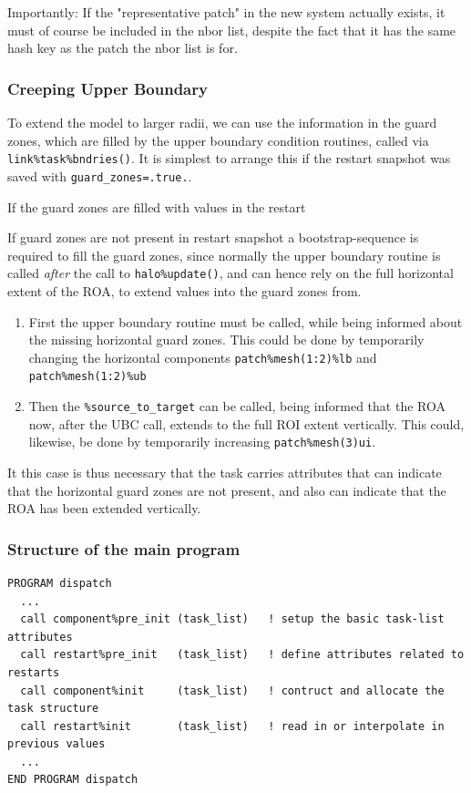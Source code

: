 \documentclass[paper=a4,fontsize=11pt]{scrartcl}
\numberwithin{equation}{section}		%
\numberwithin{figure}{section}			%
\numberwithin{table}{section}				%
\newcommand{\codecolor}{\color{Blue}}
\begin{document}
Importantly:  If the "representative patch" in the new system actually exists, it must of course be included in the nbor list, despite the fact that it has the same hash key as the patch the nbor list is for.

\subsubsection{Creeping Upper Boundary}
To extend the model to larger radii, we can use the information in the guard zones, which are filled by the upper boundary condition routines, called via \verb|link%task%bndries()|. It is simplest to arrange this if the restart snapshot was saved with \verb|guard_zones=.true.|.

If the guard zones are filled with values in the restart 

If guard zones are not present in restart snapshot a bootstrap-sequence is required to fill the guard zones, since normally the upper boundary routine is called \textit{after} the call to \verb|halo%update()|, and can hence rely on the full horizontal extent of the ROA, to extend values into the guard zones from.
\begin{enumerate}
    \item First the upper boundary routine must be called, while being informed about the missing horizontal guard zones.  This could be done by temporarily changing the horizontal components \verb|patch%mesh(1:2)%lb| and \verb|patch%mesh(1:2)%ub|
    \item Then the \verb|%source_to_target| can be called, being informed that the ROA now, after the UBC call, extends to the full ROI extent vertically.  This could, likewise, be done by temporarily increasing \Verb|patch%mesh(3)ui|.
\end{enumerate}
It this case is thus necessary that the task carries attributes that can indicate that the horizontal guard zones are not present, and also can indicate that the ROA has been extended vertically.

\subsubsection{Structure of the main program}
{\small\codecolor\begin{verbatim}
PROGRAM dispatch
  ...
  call component%pre_init (task_list)   ! setup the basic task-list attributes
  call restart%pre_init   (task_list)   ! define attributes related to restarts
  call component%init     (task_list)   ! contruct and allocate the task structure
  call restart%init       (task_list)   ! read in or interpolate in previous values
  ...
END PROGRAM dispatch
\end{verbatim}}
\end{document}
